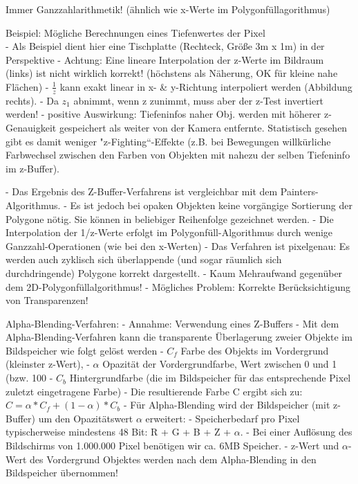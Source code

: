 \documentclass[10pt,landscape]{article}
\begin{document}
\begin{multicols}{3}
Immer Ganzzahlarithmetik! (ähnlich wie x-Werte im Polygonfüllagorithmus)

Beispiel: Mögliche Berechnungen eines Tiefenwertes der Pixel\\
- Als Beispiel dient hier eine Tischplatte (Rechteck, Größe 3m x 1m) in der Perspektive 
- Achtung: Eine lineare Interpolation der z-Werte im Bildraum (links) ist nicht wirklich korrekt! (höchstens als Näherung, OK für kleine nahe Flächen)
- $\frac{1}{z}$ kann exakt linear in x- \& y-Richtung interpoliert werden (Abbildung rechts).
- Da $z_1$ abnimmt, wenn z zunimmt, muss aber der z-Test invertiert werden!
- positive Auswirkung: Tiefeninfos naher Obj. werden mit höherer z-Genauigkeit gespeichert als weiter von der Kamera entfernte. Statistisch gesehen gibt es damit weniger "z-Fighting“-Effekte (z.B. bei Bewegungen willkürliche Farbwechsel zwischen den Farben von Objekten mit nahezu der selben Tiefeninfo im z-Buffer).


- Das Ergebnis des Z-Buffer-Verfahrens ist vergleichbar mit dem Painters-Algorithmus.
- Es ist jedoch bei opaken Objekten keine vorgängige Sortierung der Polygone nötig. Sie können in beliebiger Reihenfolge gezeichnet werden.
- Die Interpolation der 1/z-Werte erfolgt im Polygonfüll-Algorithmus durch wenige Ganzzahl-Operationen (wie bei den x-Werten)
- Das Verfahren ist pixelgenau: Es werden auch zyklisch sich überlappende (und sogar räumlich sich durchdringende) Polygone korrekt dargestellt.
- Kaum Mehraufwand gegenüber dem 2D-Polygonfüllalgorithmus!
- Mögliches Problem: Korrekte Berücksichtigung von Transparenzen!

Alpha-Blending-Verfahren: 
- Annahme: Verwendung eines Z-Buffers 
- Mit dem Alpha-Blending-Verfahren kann die transparente Überlagerung zweier Objekte im Bildspeicher wie folgt gelöst werden
  - $C_f$ Farbe des Objekts im Vordergrund (kleinster z-Wert),
  - $\alpha$ Opazität der Vordergrundfarbe, Wert zwischen 0 und 1 (bzw. 100%
  - $C_b$ Hintergrundfarbe (die im Bildspeicher für das entsprechende Pixel zuletzt eingetragene Farbe)
- Die resultierende Farbe C ergibt sich zu: $C=\alpha*C_f+(1-\alpha)*C_b$
- Für Alpha-Blending wird der Bildspeicher (mit z-Buffer) um den Opazitätswert $\alpha$ erweitert:
  - Speicherbedarf pro Pixel typischerweise mindestens 48 Bit: R + G + B + Z + $\alpha$.
  - Bei einer Auflösung des Bildschirms von 1.000.000 Pixel benötigen wir ca. 6MB Speicher.
  - z-Wert und $\alpha$-Wert des Vordergrund Objektes werden nach dem Alpha-Blending in den Bildspeicher übernommen!


\end{multicols}
\end{document}
